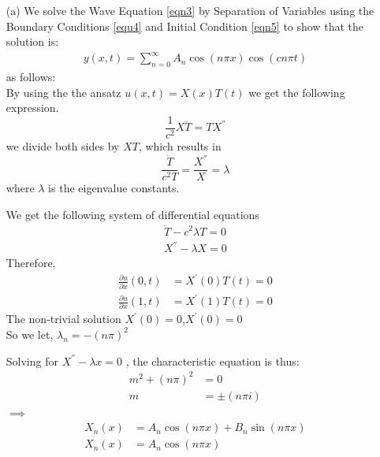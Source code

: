 \documentclass[12pt,a4paper]{article}
\begin{document}
\begin{enumerate}
	\item[(a)] We solve the Wave Equation \eqref{eqn3} by Separation of Variables using the Boundary Conditions \eqref{equ4} and Initial Condition \eqref{eqn5}  to show that the solution is:
	\begin{align*}
			 y(x,t)=\sum_{n=0}^{\infty}A_n\cos(n\pi x)\cos(cn\pi t)
	\end{align*}
	as follows:
	\\
	By using the the ansatz $u(x,t)=X(x) T(t)$ we get the following expression.\\
	 \[\frac{1}{c^2}X\ddot{T}=TX^{''}\]
 we divide both sides by $XT$, which results in
 \[\frac{\ddot{T}}{c^{2}T}=\frac{X^{''}}{X}=\lambda\]
 where $\lambda$ is the eigenvalue constants.
 
 We get the following system of differential equations 
\begin{align*}
\ddot{T}-  c^2 \lambda T=0\\
X^{''}-\lambda X=0
\end{align*}
Therefore,
\begin{align*}
\frac{\partial u}{\partial x}(0,t) &=X^{'}(0)T(t)=0\\
\frac{\partial u}{\partial x}(1,t) &=X^{'}(1)T(t)=0
\end{align*}
The non-trivial solution $X^{'}(0)=0$,$X^{'}(0)=0$\\

So we let,  $\lambda_n=-(n\pi)^2$

Solving for $X^{''}-\lambda x=0$ , the characteristic equation is thus:
\begin{align*}
m^{2}+(n\pi)^2 &=0\\
m &=\pm(n\pi i)
\end{align*}
$\implies$
\begin{align*}
X_n(x) &=A_n\cos(n\pi x)+B_n\sin(n\pi x)\\
X_n(x) &=A_n\cos(n\pi x)
\end{align*}


\end{enumerate}
\end{document}
